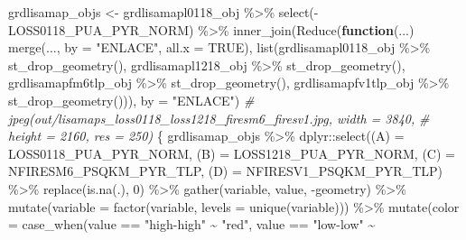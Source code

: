 \documentclass[10pt,landscape,a3paper]{article}
\newenvironment{Shaded}{\begin{snugshade}}{\end{snugshade}}
\newcommand{\AttributeTok}[1]{\textcolor[rgb]{0.77,0.63,0.00}{#1}}
\newcommand{\CommentTok}[1]{\textcolor[rgb]{0.56,0.35,0.01}{\textit{#1}}}
\newcommand{\ConstantTok}[1]{\textcolor[rgb]{0.00,0.00,0.00}{#1}}
\newcommand{\ControlFlowTok}[1]{\textcolor[rgb]{0.13,0.29,0.53}{\textbf{#1}}}
\newcommand{\DecValTok}[1]{\textcolor[rgb]{0.00,0.00,0.81}{#1}}
\newcommand{\FunctionTok}[1]{\textcolor[rgb]{0.00,0.00,0.00}{#1}}
\newcommand{\NormalTok}[1]{#1}
\newcommand{\OtherTok}[1]{\textcolor[rgb]{0.56,0.35,0.01}{#1}}
\newcommand{\SpecialCharTok}[1]{\textcolor[rgb]{0.00,0.00,0.00}{#1}}
\newcommand{\StringTok}[1]{\textcolor[rgb]{0.31,0.60,0.02}{#1}}
\begin{document}
\begin{Shaded}
\begin{Highlighting}[]
\NormalTok{grdlisamap\_objs }\OtherTok{\textless{}{-}}\NormalTok{ grdlisamapl0118\_obj }\SpecialCharTok{\%\textgreater{}\%}
    \FunctionTok{select}\NormalTok{(}\SpecialCharTok{{-}}\NormalTok{LOSS0118\_PUA\_PYR\_NORM) }\SpecialCharTok{\%\textgreater{}\%}
    \FunctionTok{inner\_join}\NormalTok{(}\FunctionTok{Reduce}\NormalTok{(}\ControlFlowTok{function}\NormalTok{(...) }\FunctionTok{merge}\NormalTok{(..., }\AttributeTok{by =} \StringTok{"ENLACE"}\NormalTok{, }\AttributeTok{all.x =} \ConstantTok{TRUE}\NormalTok{), }\FunctionTok{list}\NormalTok{(grdlisamapl0118\_obj }\SpecialCharTok{\%\textgreater{}\%}
        \FunctionTok{st\_drop\_geometry}\NormalTok{(), grdlisamapl1218\_obj }\SpecialCharTok{\%\textgreater{}\%}
        \FunctionTok{st\_drop\_geometry}\NormalTok{(), grdlisamapfm6tlp\_obj }\SpecialCharTok{\%\textgreater{}\%}
        \FunctionTok{st\_drop\_geometry}\NormalTok{(), grdlisamapfv1tlp\_obj }\SpecialCharTok{\%\textgreater{}\%}
        \FunctionTok{st\_drop\_geometry}\NormalTok{())), }\AttributeTok{by =} \StringTok{"ENLACE"}\NormalTok{)}
\CommentTok{\# jpeg(\textquotesingle{}out/lisamaps\_loss0118\_loss1218\_firesm6\_firesv1.jpg\textquotesingle{}, width = 3840,}
\CommentTok{\# height = 2160, res = 250)}
\NormalTok{\{}
\NormalTok{    grdlisamap\_objs }\SpecialCharTok{\%\textgreater{}\%}
\NormalTok{        dplyr}\SpecialCharTok{::}\FunctionTok{select}\NormalTok{(}\StringTok{\textasciigrave{}}\AttributeTok{(A)}\StringTok{\textasciigrave{}} \OtherTok{=}\NormalTok{ LOSS0118\_PUA\_PYR\_NORM, }\StringTok{\textasciigrave{}}\AttributeTok{(B)}\StringTok{\textasciigrave{}} \OtherTok{=}\NormalTok{ LOSS1218\_PUA\_PYR\_NORM,}
            \StringTok{\textasciigrave{}}\AttributeTok{(C)}\StringTok{\textasciigrave{}} \OtherTok{=}\NormalTok{ NFIRESM6\_PSQKM\_PYR\_TLP, }\StringTok{\textasciigrave{}}\AttributeTok{(D)}\StringTok{\textasciigrave{}} \OtherTok{=}\NormalTok{ NFIRESV1\_PSQKM\_PYR\_TLP) }\SpecialCharTok{\%\textgreater{}\%}
        \FunctionTok{replace}\NormalTok{(}\FunctionTok{is.na}\NormalTok{(.), }\DecValTok{0}\NormalTok{) }\SpecialCharTok{\%\textgreater{}\%}
        \FunctionTok{gather}\NormalTok{(variable, value, }\SpecialCharTok{{-}}\NormalTok{geometry) }\SpecialCharTok{\%\textgreater{}\%}
        \FunctionTok{mutate}\NormalTok{(}\AttributeTok{variable =} \FunctionTok{factor}\NormalTok{(variable, }\AttributeTok{levels =} \FunctionTok{unique}\NormalTok{(variable))) }\SpecialCharTok{\%\textgreater{}\%}
        \FunctionTok{mutate}\NormalTok{(}\AttributeTok{color =} \FunctionTok{case\_when}\NormalTok{(value }\SpecialCharTok{==} \StringTok{"high{-}high"} \SpecialCharTok{\textasciitilde{}} \StringTok{"red"}\NormalTok{, value }\SpecialCharTok{==} \StringTok{"low{-}low"} \SpecialCharTok{\textasciitilde{}}

\end{Highlighting}
\end{Shaded}
\end{document}
